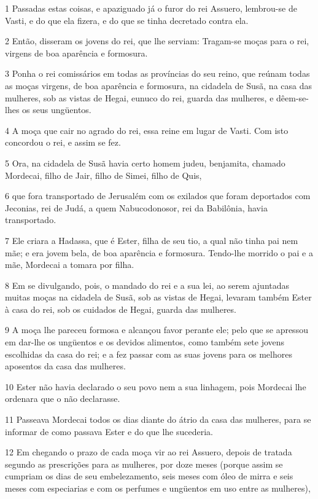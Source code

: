 \par 1 Passadas estas coisas, e apaziguado já o furor do rei Assuero, lembrou-se de Vasti, e do que ela fizera, e do que se tinha decretado contra ela.
\par 2 Então, disseram os jovens do rei, que lhe serviam: Tragam-se moças para o rei, virgens de boa aparência e formosura.
\par 3 Ponha o rei comissários em todas as províncias do seu reino, que reúnam todas as moças virgens, de boa aparência e formosura, na cidadela de Susã, na casa das mulheres, sob as vistas de Hegai, eunuco do rei, guarda das mulheres, e dêem-se-lhes os seus ungüentos.
\par 4 A moça que cair no agrado do rei, essa reine em lugar de Vasti. Com isto concordou o rei, e assim se fez.
\par 5 Ora, na cidadela de Susã havia certo homem judeu, benjamita, chamado Mordecai, filho de Jair, filho de Simei, filho de Quis,
\par 6 que fora transportado de Jerusalém com os exilados que foram deportados com Jeconias, rei de Judá, a quem Nabucodonosor, rei da Babilônia, havia transportado.
\par 7 Ele criara a Hadassa, que é Ester, filha de seu tio, a qual não tinha pai nem mãe; e era jovem bela, de boa aparência e formosura. Tendo-lhe morrido o pai e a mãe, Mordecai a tomara por filha.
\par 8 Em se divulgando, pois, o mandado do rei e a sua lei, ao serem ajuntadas muitas moças na cidadela de Susã, sob as vistas de Hegai, levaram também Ester à casa do rei, sob os cuidados de Hegai, guarda das mulheres.
\par 9 A moça lhe pareceu formosa e alcançou favor perante ele; pelo que se apressou em dar-lhe os ungüentos e os devidos alimentos, como também sete jovens escolhidas da casa do rei; e a fez passar com as suas jovens para os melhores aposentos da casa das mulheres.
\par 10 Ester não havia declarado o seu povo nem a sua linhagem, pois Mordecai lhe ordenara que o não declarasse.
\par 11 Passeava Mordecai todos os dias diante do átrio da casa das mulheres, para se informar de como passava Ester e do que lhe sucederia.
\par 12 Em chegando o prazo de cada moça vir ao rei Assuero, depois de tratada segundo as prescrições para as mulheres, por doze meses (porque assim se cumpriam os dias de seu embelezamento, seis meses com óleo de mirra e seis meses com especiarias e com os perfumes e ungüentos em uso entre as mulheres),
